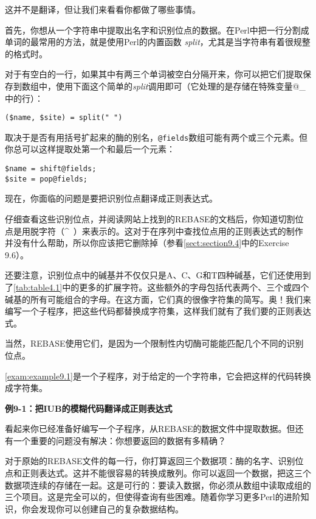 这并不是翻译，但让我们来看看你都做了哪些事情。

首先，你想从一个字符串中提取出名字和识别位点的数据。在Perl中把一行分割成单词的最常用的方法，就是使用Perl的内置函数 \textit{split}，尤其是当字符串有着很规整的格式时。

对于有空白的一行，如果其中有两三个单词被空白分隔开来，你可以把它们提取保存到数组中，使用下面这个简单的\textit{split}调用即可（它处理的是存储在特殊变量@\_中的行）：

\begin{lstlisting}
($name, $site) = split(" ")
\end{lstlisting}

取决于是否有用括号扩起来的酶的别名，\verb|@fields|数组可能有两个或三个元素。但你总可以这样提取处第一个和最后一个元素：

\begin{lstlisting}
$name = shift@fields;
$site = pop@fields;
\end{lstlisting}

现在，你面临的问题是要把识别位点翻译成正则表达式。

仔细查看这些识别位点，并阅读网站上找到的REBASE的文档后，你知道切割位点是用脱字符（\^~）来表示的。这对于在序列中查找位点用的正则表达式的制作并没有什么帮助，所以你应该把它删除掉（参看\autoref{sect:section9.4}中的Exercise 9.6）。

还要注意，识别位点中的碱基并不仅仅只是A、C、G和T四种碱基，它们还使用到了\autoref{tab:table4.1}中的更多的扩展字符。这些额外的字母包括代表两个、三个或四个碱基的所有可能组合的字母。在这方面，它们真的很像字符集的简写。奥！我们来编写一个子程序，把这些代码都替换成字符集，这样我们就有了我们要的正则表达式。

当然，REBASE使用它们，是因为一个限制性内切酶可能能匹配几个不同的识别位点。

\autoref{exam:example9.1}是一个子程序，对于给定的一个字符串，它会把这样的代码转换成字符集。

\textbf{例9-1：把IUB的模糊代码翻译成正则表达式}


看起来你已经准备好编写一个子程序，从REBASE的数据文件中提取数据。但还有一个重要的问题没有解决：你想要返回的数据有多精确？

对于原始的REBASE文件的每一行，你打算返回三个数据项：酶的名字、识别位点和正则表达式。这并不能很容易的转换成散列。你可以返回一个数据，把这三个数据项连续的存储在一起。这是可行的：要读入数据，你必须从数组中读取成组的三个项目。这是完全可以的，但使得查询有些困难。随着你学习更多Perl的进阶知识，你会发现你可以创建自己的复杂数据结构。

